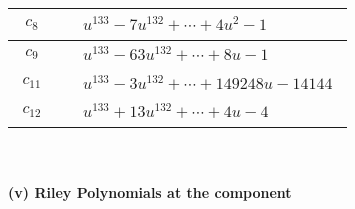 \documentclass[1p]{elsarticle_modified}
\theoremstyle{definition}
\begin{document}
\begin{tabular}{m{50pt}|m{274pt}}
\hline $$\begin{aligned}c_{8}\end{aligned}$$&$\begin{aligned}
&u^{133}-7 u^{132}+\cdots+4 u^2-1
\end{aligned}$\\
\hline $$\begin{aligned}c_{9}\end{aligned}$$&$\begin{aligned}
&u^{133}-63 u^{132}+\cdots+8 u-1
\end{aligned}$\\
\hline $$\begin{aligned}c_{11}\end{aligned}$$&$\begin{aligned}
&u^{133}-3 u^{132}+\cdots+149248 u-14144
\end{aligned}$\\
\hline $$\begin{aligned}c_{12}\end{aligned}$$&$\begin{aligned}
&u^{133}+13 u^{132}+\cdots+4 u-4
\end{aligned}$\\
\hline
\end{tabular}\\~\\
\newpage\renewcommand{\arraystretch}{1}
\flushleft \textbf{(v) Riley Polynomials at the component}\newline \\
\end{document}
